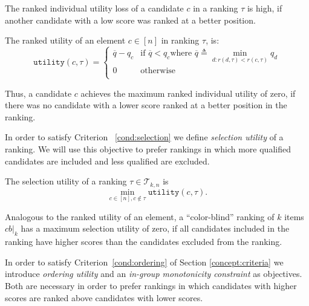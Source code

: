 The ranked individual utility loss of a candidate $c$ in a ranking $\tau$ is high, if another candidate with a low score was ranked at a better position.

\begin{definition}
	\label{def:rankedIndividualFairness}
	The ranked utility of an element $c \in [n]$ in ranking $\tau$, is:
	\[
	\texttt{utility}(c,\tau) = \begin{cases}
	\overline{q} - q_c &\textrm{if~} \overline{q} < q_c \textrm{where~} \overline{q}\triangleq \min_{d: r(d,\tau) < r(c,\tau)} q_d  \\
	0 & \textrm{otherwise}\\
	\end{cases}
	\]
\end{definition}
%
\noindent Thus, a candidate $c$ achieves the maximum ranked individual utility of zero, if there was no candidate with a lower score ranked at a better position in the ranking. 
%

%
In order to satisfy Criterion ~\ref{cond:selection} we define \emph{selection utility} of a ranking. We will use this objective to prefer rankings in which more qualified candidates are included and less qualified are excluded.
%
\begin{definition}
	\label{def:selectionFairness}
	The selection utility of a ranking
	$\tau \in {\mathcal T}_{k,n}$ is \[\min_{c \in [n], c \notin \tau} \texttt{utility}(c,\tau).\]
\end{definition}
%
\noindent Analogous to the ranked utility of an element, a ``color-blind'' ranking of $k$ items $\textit{cb}|_k$ has a maximum selection utility of zero, if all candidates included in the ranking have higher scores than the candidates excluded from the ranking.

%
In order to satisfy Criterion~\ref{cond:ordering} of Section \ref{concept:criteria} we introduce \emph{ordering utility} and an \emph{in-group monotonicity constraint} as objectives. Both are necessary in order to prefer rankings in which candidates with higher scores are ranked above candidates with lower scores.

